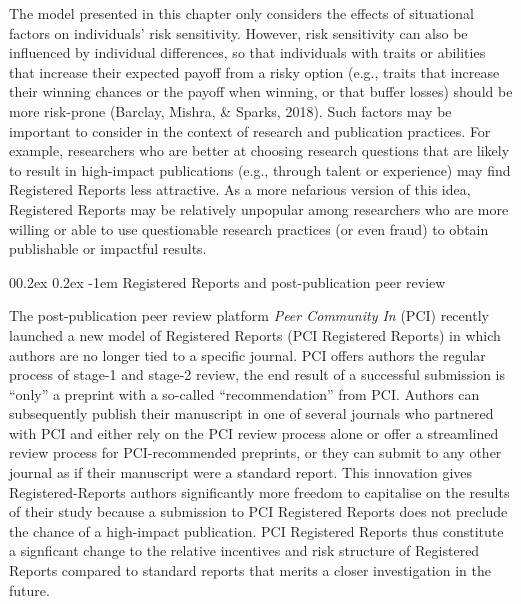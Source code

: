 \documentclass[british,,doc,mask,floatsintext]{apa6}
\makeatletter
\renewcommand{\paragraph}{\@startsection{paragraph}{4}{\parindent}%
  {0\baselineskip \@plus 0.2ex \@minus 0.2ex}%
  {-1em}%
  {\normalfont\normalsize\bfseries\itshape\typesectitle}}
\makeatother
\begin{document}
The model presented in this chapter only considers the effects of situational factors on individuals' risk sensitivity.
However, risk sensitivity can also be influenced by individual differences, so that individuals with traits or abilities that increase their expected payoff from a risky option (e.g., traits that increase their winning chances or the payoff when winning, or that buffer losses) should be more risk-prone (Barclay, Mishra, \& Sparks, 2018).
Such factors may be important to consider in the context of research and publication practices.
For example, researchers who are better at choosing research questions that are likely to result in high-impact publications (e.g., through talent or experience) may find Registered Reports less attractive.
As a more nefarious version of this idea, Registered Reports may be relatively unpopular among researchers who are more willing or able to use questionable research practices (or even fraud) to obtain publishable or impactful results.

\hypertarget{registered-reports-and-post-publication-peer-review}{%
\paragraph{Registered Reports and post-publication peer review}\label{registered-reports-and-post-publication-peer-review}}

The post-publication peer review platform \emph{Peer Community In} (PCI) recently launched a new model of Registered Reports (PCI Registered Reports) in which authors are no longer tied to a specific journal.
PCI offers authors the regular process of stage-1 and stage-2 review, the end result of a successful submission is \enquote{only} a preprint with a so-called \enquote{recommendation} from PCI.
Authors can subsequently publish their manuscript in one of several journals who partnered with PCI and either rely on the PCI review process alone or offer a streamlined review process for PCI-recommended preprints, or they can submit to any other journal as if their manuscript were a standard report.
This innovation gives Registered-Reports authors significantly more freedom to capitalise on the results of their study because a submission to PCI Registered Reports does not preclude the chance of a high-impact publication.
PCI Registered Reports thus constitute a signficant change to the relative incentives and risk structure of Registered Reports compared to standard reports that merits a closer investigation in the future.
\end{document}
